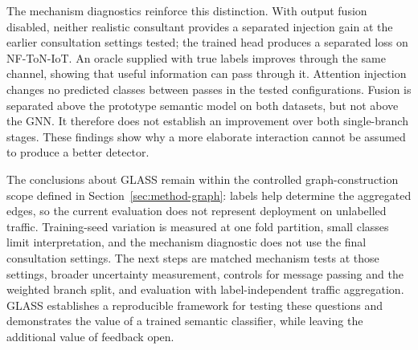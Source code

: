 The mechanism diagnostics reinforce this distinction. With output fusion disabled, neither realistic consultant provides a separated injection gain at the earlier consultation settings tested; the trained head produces a separated loss on NF-ToN-IoT. An oracle supplied with true labels improves through the same channel, showing that useful information can pass through it. Attention injection changes no predicted classes between passes in the tested configurations. Fusion is separated above the prototype semantic model on both datasets, but not above the GNN. It therefore does not establish an improvement over both single-branch stages. These findings show why a more elaborate interaction cannot be assumed to produce a better detector.

The conclusions about GLASS remain within the controlled graph-construction scope defined in Section~\ref{sec:method-graph}: labels help determine the aggregated edges, so the current evaluation does not represent deployment on unlabelled traffic. Training-seed variation is measured at one fold partition, small classes limit interpretation, and the mechanism diagnostic does not use the final consultation settings. The next steps are matched mechanism tests at those settings, broader uncertainty measurement, controls for message passing and the weighted branch split, and evaluation with label-independent traffic aggregation. GLASS establishes a reproducible framework for testing these questions and demonstrates the value of a trained semantic classifier, while leaving the additional value of feedback open.
